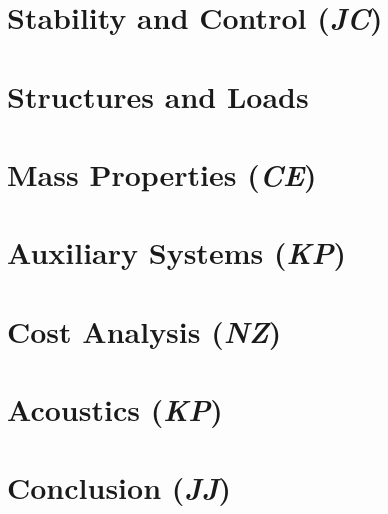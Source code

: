 \documentclass[conf]{new-aiaa}
\begin{document}
\clearpage
\section{Stability and Control (\textit{JC})}
\label{section: Stab and Control}


\clearpage
\section{Structures and Loads}
\label{section: Structures and Loads}


\clearpage
\section{Mass Properties (\textit{CE})}
\label{section: Mass Properties}


%

\clearpage
\section{Auxiliary Systems (\textit{KP})}
\label{section: Systems}


\clearpage
\section{Cost Analysis (\textit{NZ})}    
\label{section: Cost}


\clearpage
\section{Acoustics (\textit{KP})}    
\label{section: Acoustics}



\clearpage
\section{Conclusion (\textit{JJ})}
\label{section: Conclusion}



\label{section: Requirements}


\newpage

\end{document}
